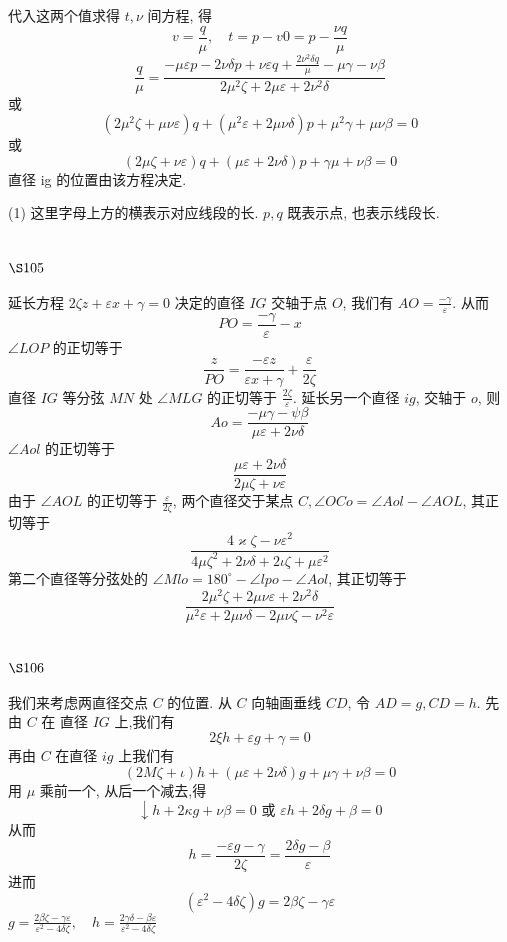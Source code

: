 代入这两个值求得 $t, \nu$ 间方程, 得
\[
v=\frac{q}{\mu}, \quad t=p-v 0=p-\frac{\nu q}{\mu}
\]
\[
\frac{q}{\mu}=\frac{-\mu \varepsilon p-2 \nu \delta p+\nu \varepsilon q+\frac{2 \nu^{2} \delta q}{\mu}-\mu \gamma-\nu \beta}{2 \mu^{2} \zeta+2 \mu \varepsilon+2 \nu^{2} \delta}
\]
或
\[
\left(2 \mu^{2} \zeta+\mu \nu \varepsilon\right) q+\left(\mu^{2} \varepsilon+2 \mu \nu \delta\right) p+\mu^{2} \gamma+\mu \nu \beta=0
\]
或
\[
(2 \mu \zeta+\nu \varepsilon) q+(\mu \varepsilon+2 \nu \delta) p+\gamma \mu+\nu \beta=0
\]
直径 ig 的位置由该方程决定.

(1) 这里字母上方的横表示对应线段的长. $p, q$ 既表示点, 也表示线段长. 

\section{$\S 105$}

延长方程 $2 \zeta z+\varepsilon x+\gamma=0$ 决定的直径 $I G$ 交轴于点 $O$, 我们有 $A O=\frac{-\gamma}{\varepsilon}$. 从而
\[
P O=\frac{-\gamma}{\varepsilon}-x
\]
$\angle L O P$ 的正切等于
\[
\frac{z}{P O}=\frac{-\varepsilon z}{\varepsilon x+\gamma}+\frac{\varepsilon}{2 \zeta}
\]
直径 $I G$ 等分弦 $M N$ 处 $\angle M L G$ 的正切等于 $\frac{2 \zeta}{\varepsilon}$. 延长另一个直径 $i g$, 交轴于 $o$, 则
\[
A o=\frac{-\mu \gamma-\psi \beta}{\mu \varepsilon+2 \nu \delta}
\]
$\angle A o l$ 的正切等于
\[
\frac{\mu \varepsilon+2 \nu \delta}{2 \mu \zeta+\nu \varepsilon}
\]
由于 $\angle A O L$ 的正切等于 $\frac{\varepsilon}{2 \zeta}$, 两个直径交于某点 $C, \angle O C o=\angle A o l-\angle A O L$, 其正切等于
\[
\frac{4 \varkappa \zeta-\nu \varepsilon^{2}}{4 \mu \zeta^{2}+2 \nu \delta+2 \iota \zeta+\mu \varepsilon^{2}}
\]
第二个直径等分弦处的 $\angle M l o=180^{\circ}-\angle l p o-\angle A o l$, 其正切等于
\[
\frac{2 \mu^{2} \zeta+2 \mu \nu \varepsilon+2 \nu^{2} \delta}{\mu^{2} \varepsilon+2 \mu \nu \delta-2 \mu \nu \zeta-\nu^{2} \varepsilon}
\]
\section{$\S 106$}

我们来考虑两直径交点 $C$ 的位置. 从 $C$ 向轴画垂线 $C D$, 令 $A D=g, C D=h$. 先由 $C$ 在 直径 $I G$ 上,我们有
\[
2 \xi h+\varepsilon g+\gamma=0
\]
再由 $C$ 在直径 $i g$ 上我们有
\[
(2 M \zeta+\iota) h+(\mu \varepsilon+2 \nu \delta) g+\mu \gamma+\nu \beta=0
\]
用 $\mu$ 乘前一个, 从后一个减去,得
\[
\downarrow h+2 \kappa g+\nu \beta=0 \text { 或 } \varepsilon h+2 \delta g+\beta=0
\]
从而
\[
h=\frac{-\varepsilon g-\gamma}{2 \zeta}=\frac{2 \delta g-\beta}{\varepsilon}
\]
进而
\[
\left(\varepsilon^{2}-4 \delta \zeta\right) g=2 \beta \zeta-\gamma \varepsilon
\]
$g=\frac{2 \beta \zeta-\gamma \varepsilon}{\varepsilon^2-4 \delta \zeta}, \quad h=\frac{2 \gamma \delta-\beta \varepsilon}{\varepsilon^2-4 \delta \zeta}$

